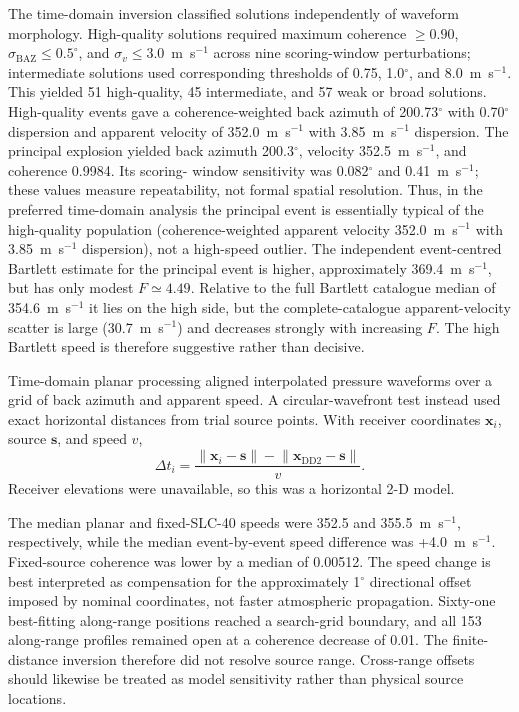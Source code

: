 \documentclass[]{seismica}
\begin{document}
\FloatBarrier

The time-domain inversion classified solutions independently of waveform
morphology. High-quality solutions required maximum coherence $\geq0.90$,
$\sigma_{\mathrm{BAZ}}\leq0.5^\circ$, and
$\sigma_v\leq3.0$~m~s$^{-1}$ across nine scoring-window perturbations;
intermediate solutions used corresponding thresholds of 0.75, 1.0$^\circ$,
and 8.0~m~s$^{-1}$. This yielded 51 high-quality, 45 intermediate, and 57
weak or broad solutions. High-quality events gave a
coherence-weighted back azimuth of 200.73$^\circ$ with 0.70$^\circ$
dispersion and apparent velocity of 352.0~m~s$^{-1}$ with
3.85~m~s$^{-1}$ dispersion. The principal explosion yielded back azimuth
200.3$^\circ$, velocity 352.5~m~s$^{-1}$, and coherence 0.9984. Its scoring-
window sensitivity was 0.082$^\circ$ and 0.41~m~s$^{-1}$; these values
measure repeatability, not formal spatial resolution. Thus, in the preferred
time-domain analysis the principal event is essentially typical of the
high-quality population (coherence-weighted apparent velocity
352.0~m~s$^{-1}$ with 3.85~m~s$^{-1}$ dispersion), not a high-speed outlier.
The independent event-centred Bartlett estimate for the principal event is
higher, approximately 369.4~m~s$^{-1}$, but has only modest $F\simeq4.49$.
Relative to the full Bartlett catalogue median of 354.6~m~s$^{-1}$ it lies on
the high side, but the complete-catalogue apparent-velocity scatter is large
(30.7~m~s$^{-1}$) and decreases strongly with increasing $F$. The high Bartlett
speed is therefore suggestive rather than decisive.

Time-domain planar processing aligned interpolated pressure waveforms over a
grid of back azimuth and apparent speed. A circular-wavefront test instead
used exact horizontal distances from trial source points. With receiver
coordinates $\mathbf{x}_i$, source $\mathbf{s}$, and speed $v$,
\begin{equation}
 \Delta t_i=\frac{\lVert\mathbf{x}_i-\mathbf{s}\rVert-
 \lVert\mathbf{x}_{\mathrm{DD2}}-\mathbf{s}\rVert}{v}.
\end{equation}
Receiver elevations were unavailable, so this was a horizontal 2-D model.

The median planar and fixed-SLC-40 speeds were 352.5 and
355.5~m~s$^{-1}$, respectively, while the median event-by-event speed
difference was +4.0~m~s$^{-1}$. Fixed-source coherence was lower by a median
of 0.00512. The speed change is best interpreted as compensation for the
approximately 1$^\circ$ directional offset imposed by nominal coordinates,
not faster atmospheric propagation. Sixty-one best-fitting along-range
positions reached a search-grid boundary, and all 153 along-range profiles
remained open at a coherence decrease of 0.01. The finite-distance inversion
therefore did not resolve source range. Cross-range offsets should likewise be
treated as model sensitivity rather than physical source locations.
\end{document}
